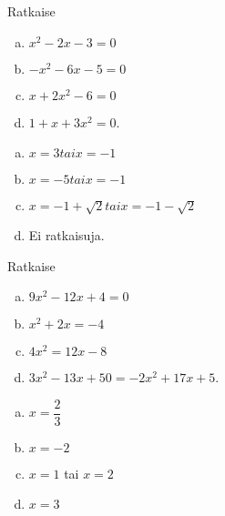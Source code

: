 

\Harjoitustehtavat

\begin{tehtava}
    Ratkaise
    \begin{enumerate}[a)]
        \item $x^2 - 2x - 3 = 0$
        \item $-x^2 - 6x - 5 = 0$
        \item $x + 2x^2 - 6= 0$
        \item $1 + x + 3x^2= 0$.
    \end{enumerate}
    \begin{vastaus}
        \begin{enumerate}[a)]
            \item $x = 3 tai x = -1$
            \item $x = -5 tai x = -1$
            \item $x = -1 + \sqrt{2} tai x = -1 - \sqrt{2}$
            \item Ei ratkaisuja.
        \end{enumerate}
    \end{vastaus}
\end{tehtava}

\begin{tehtava}
    Ratkaise
    \begin{enumerate}[a)]
        \item $9x^2 - 12x + 4 = 0$
        \item $x^2 + 2x = -4$
        \item $4x^2 = 12x - 8$
        \item $3x^2 - 13x + 50 = -2x^2 + 17x + 5$.
    \end{enumerate}
    \begin{vastaus}
        \begin{enumerate}[a)]
            \item $x = \dfrac{2}{3}$
            \item $x = -2$
            \item $x = 1$ tai $x = 2$
            \item $x = 3$
        \end{enumerate}
    \end{vastaus}
\end{tehtava}

